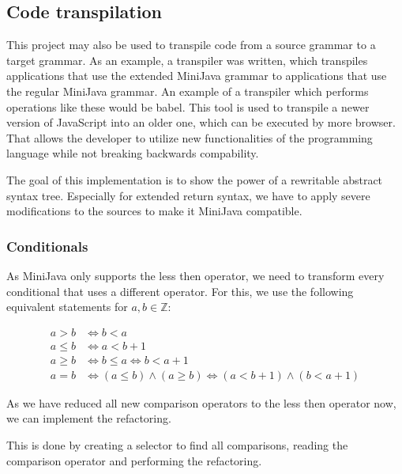 
\subsection{Code transpilation}

This project may also be used to transpile code from a source grammar to a target grammar. As an example, a transpiler was written, which transpiles applications that use
the extended MiniJava grammar to applications that use the regular MiniJava grammar. An example of a transpiler which performs operations like these would be babel. This tool is
used to transpile a newer version of JavaScript into an older one, which can be executed by more browser. That allows the developer to utilize new functionalities of the programming language while not breaking backwards compability.

The goal of this implementation is to show the power of a rewritable abstract syntax tree. Especially for extended return syntax, we have to apply severe modifications to the sources
to make it MiniJava compatible.

\subsubsection{Conditionals}

As MiniJava only supports the less then operator, we need to transform every conditional that uses a different operator.
For this, we use the following equivalent statements for $a, b \in \mathbb{Z}$:

\begin{align}
    a > b  &\Longleftrightarrow b < a\\
    a \leq b  &\Longleftrightarrow a < b + 1\\
    a \geq b  &\Longleftrightarrow b \leq a \Longleftrightarrow b < a + 1\\
    a = b  &\Longleftrightarrow (a \leq b) \land (a \geq b) \Longleftrightarrow (a < b + 1) \land (b < a+ 1)
\end{align}

As we have reduced all new comparison operators to the less then operator now, we can implement the refactoring.

This is done by creating a selector to find all comparisons, reading the comparison operator and performing the refactoring.